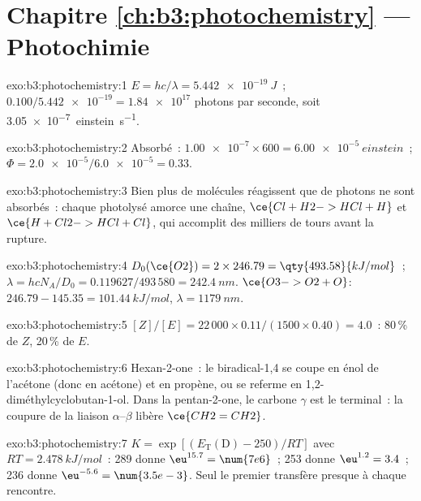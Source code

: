 \section*{Chapitre \ref{ch:b3:photochemistry} --- Photochimie}

\begin{solution}{exo:b3:photochemistry:1}
$E = hc/\lambda = \qty{5.442e-19}{J}$~; $0.100/\num{5.442e-19} = \num{1.84e17}$ photons par seconde, soit
\qty{3.05e-7}{einstein.s^{-1}}.
\end{solution}

\begin{solution}{exo:b3:photochemistry:2}
Absorbé~: $\num{1.00e-7} \times 600 = \qty{6.00e-5}{einstein}$~; $\Phi = \num{2.0e-5}/\num{6.0e-5} = 0.33$.
\end{solution}

\begin{solution}{exo:b3:photochemistry:3}
Bien plus de molécules réagissent que de photons ne sont absorbés~:
chaque  photolysé amorce une
chaîne, $\ce{Cl + H2 -> HCl + H}$ et $\ce{H + Cl2 -> HCl + Cl}$, qui
accomplit des milliers de tours avant la
rupture.
\end{solution}

\begin{solution}{exo:b3:photochemistry:4}
$D_0(\ce{O2}) = 2 \times 246.79 = \qty{493.58}{kJ/mol}$~; $\lambda = hcN_A/D_0 = 0.119627/493\,580 =
\qty{242.4}{nm}$. $\ce{O3 -> O2 + O}$: $246.79 - 145.35 = \qty{101.44}{kJ/mol}$, $\lambda = \qty{1179}{nm}$.
\end{solution}

\begin{solution}{exo:b3:photochemistry:5}
$[Z]/[E] = 22\,000 \times 0.11/(1500 \times 0.40) = 4.0$~: 80\,\% de $Z$, 20\,\% de $E$.
\end{solution}

\begin{solution}{exo:b3:photochemistry:6}
Hexan-2-one~: le biradical-1,4 se coupe en énol de l'acétone (donc en
acétone) et en
propène, ou se referme en 1,2-diméthylcyclobutan-1-ol. Dans la
pentan-2-one, le carbone $\gamma$
est le  terminal~: la coupure de la liaison $\alpha$--$\beta$ libère $\ce{CH2=CH2}$.
\end{solution}

\begin{solution}{exo:b3:photochemistry:7}
$K = \exp[(E_{\mathrm T}(\mathrm D) - 250)/RT]$ avec $RT = \qty{2.478}{kJ/mol}$~: 289 donne $\eu^{15.7} = \num{7e6}$~;
253 donne $\eu^{1.2} = 3.4$~; 236 donne $\eu^{-5.6} = \num{3.5e-3}$. Seul
le premier transfère presque à chaque rencontre.
\end{solution}

